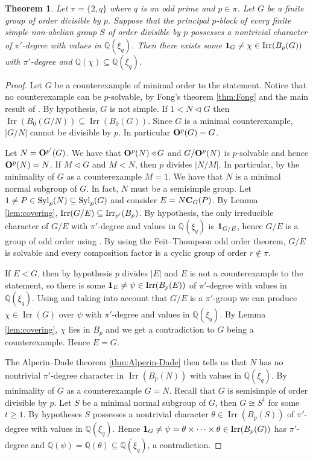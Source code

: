 \documentclass[a4paper,12pt,leqno]{amsart}
\def\irr#1{{\Irr}(#1)}
\def\syl#1#2{{\rm Syl}_{#1}(#2)}
\def\nor{\triangleleft}
\def\cent#1#2{{\bf C}_{#1}(#2)}
\def\sbs{\subseteq}
\newcommand{\6}{^}
\newcommand{\Irr}{\operatorname{Irr}}
\newtheorem{thm}[subsection]{Theorem}
\theoremstyle{definition}
\theoremstyle{definition}
\theoremstyle{definition}
\theoremstyle{definition}
\theoremstyle{definition}
\def\Q{\mathbb Q}
\begin{document}
\begin{thm}\label{reduction} 
Let $\pi=\{ 2, q \}$ where $q$ is an odd prime and $p\in \pi$. Let $G$ be a finite group of order divisible by $p$.
Suppose that the principal $p$-block of every finite simple non-abelian group $S$ of order divisible by $p$ possesses a nontrivial character of $\pi'$-degree with values in $\mathbb Q(\xi_q)$. 
Then there exists some ${\bf 1}_G\neq \chi \in \irr {B_p(G)}$ with $\pi'$-degree and $\Q(\chi)\sbs \mathbb Q(\xi_q)$.
\end{thm}
\begin{proof}  
Let $G$ be a counterexample of minimal order to the statement.
Notice that no counterexample can be $p$-solvable, by Fong's theorem \ref{thm:Fong} and the main result of \cite{GHSV21}.
By hypothesis, $G$ is not simple. If $1<N\nor G$ then $\Irr(B_0(G/N))\sbs\Irr(B_0(G))$. Since $G$ is a minimal counterexample, $|G/N|$ cannot be divisible by $p$. In particular ${\bf O}^p(G)=G$. 

Let $N={\bf O}^{p'}(G)$.
We have that ${\bf O}^p(N)\nor G$ and $G/{\bf O}^p(N)$ is $p$-solvable and hence ${\bf O}^p(N)=N$. 
If $M \nor G$ and $M<N$, then $p$ divides $|N/M|$. In particular, by the minimality of $G$ as a counterexample $M=1$.
We have that $N$ is a minimal normal subgroup of $G$. 
In fact, $N$ must be a semisimple group. 
Let $1\neq P \in \syl p N \subseteq \syl p G$ and consider $E=N \cent G P$. 
By Lemma \ref{lem:covering}, ${\rm Irr}(G/E)\subseteq {\rm Irr}_{p'}(B_p)$. By hypothesis, the only irreducible character of $G/E$ with $\pi'$-degree and values in $\Q(\xi_q)$ is ${\bf 1}_{G/E}$, hence $G/E$ is a group of odd order using \cite[Theorem A]{GHSV21}. By using the Feit--Thompson odd order theorem, $G/E$ is solvable and every composition factor is a cyclic group of order $r \notin \pi$. 

If $E<G$, then by hypothesis $p$ divides $|E|$ and $E$ is not a counterexample to the statement, so there is some ${\bf 1}_E\neq \psi \in \irr{B_p(E)}$ of $\pi'$-degree with values in $\Q(\xi_q)$. Using \cite[Lemma 2.2]{GHSV21} and taking into account that $G/E$ is a $\pi'$-group we can produce $\chi \in \irr{G}$ over $\psi$ with $\pi'$-degree and values in $\Q(\xi_q)$. By Lemma \ref{lem:covering},
$\chi$ lies in $B_p$ and we get a contradiction to $G$ being a counterexample. Hence $E=G$. 

The Alperin--Dade theorem \ref{thm:Alperin-Dade} then tells us that $N$ has no nontrivial $\pi'$-degree character in $\irr{B_p(N)}$ with values in $\Q(\xi_q)$. 
By minimality of $G$ as a counterexample $G=N$.
Recall that $G$ is semisimple of order divisible by $p$. Let $S$ be a minimal normal subgroup of $G$, then $G\cong S^t$ for some $t \geq 1$. By hypotheses $S$
possesses 
a nontrivial character $\theta \in \irr{B_p(S)}$ of $\pi'$-degree with values in $\mathbb Q(\xi_q)$. Hence ${\bf 1}_G\neq \psi =\theta\times \cdots \times \theta \in \irr{B_p(G)}$ has $\pi'$-degree and $\Q(\psi)=\Q(\theta)\sbs \mathbb Q(\xi_q)$, a contradiction. 
\end{proof}
\end{document}

